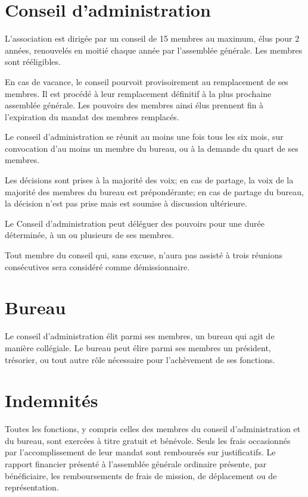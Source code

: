 \documentclass[11 pt]{article}
\begin{document}
\section{Conseil d’administration}

L’association est dirigée par un conseil de 15 membres au maximum,
élus pour 2 années, renouvelés en moitié chaque année par l’assemblée
générale. Les membres sont rééligibles.

En cas de vacance, le conseil pourvoit provisoirement au remplacement
de ses membres. Il est procédé à leur remplacement définitif à la
plus prochaine assemblée générale. Les pouvoirs des membres ainsi élus
prennent fin à l’expiration du mandat des membres remplacés.

Le conseil d’administration se réunit au moins une fois tous les six
mois, sur convocation d’au moins un membre du bureau, ou à la demande
du quart de ses membres.

Les décisions sont prises à la majorité des voix; en cas de partage,
la voix de la majorité des membres du bureau est prépondérante; en cas
de partage du bureau, la décision n’est pas prise mais est soumise à
discussion ultérieure.

Le Conseil d’administration peut déléguer des pouvoirs pour une durée
déterminée, à un ou plusieurs de ses membres.

Tout membre du conseil qui, sans excuse, n’aura pas assisté à trois
réunions consécutives sera considéré comme démissionnaire.


\section{Bureau}

Le conseil d’administration élit parmi ses membres, un bureau qui agit
de manière collégiale.  Le bureau peut élire parmi ses membres un président,
trésorier, ou tout autre rôle nécessaire pour l’achèvement de ses fonctions.

\section{Indemnités}

Toutes les fonctions, y compris celles des membres du conseil
d’administration et du bureau, sont exercées à titre gratuit et bénévole. Seuls les
frais occasionnés par l’accomplissement de leur mandat sont remboursés
sur justificatifs. Le rapport financier présenté à l’assemblée
générale ordinaire présente, par bénéficiaire, les remboursements de
frais de mission, de déplacement ou de représentation.
\end{document}
